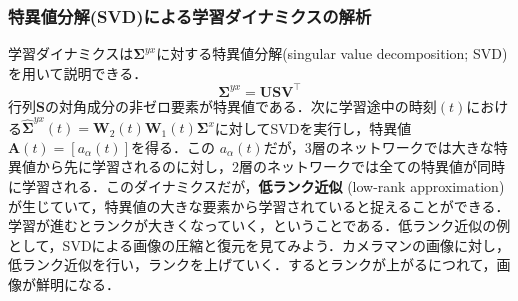\subsubsection{特異値分解(SVD)による学習ダイナミクスの解析}学習ダイナミクスは$ \mathbf{\Sigma}^{yx}$に対する特異値分解(singular value decomposition; SVD)を用いて説明できる．
$$
\mathbf{\Sigma}^{yx}=\mathbf{USV}^\top
$$
行列$ \mathbf{ S}$の対角成分の非ゼロ要素が特異値である．次に学習途中の時刻$(t)$における$\hat{\mathbf{\Sigma}}^{yx}(t)=\mathbf{W}_2 (t) \mathbf{W}_1(t) \mathbf{\Sigma}^{x}$に対してSVDを実行し，特異値$\mathbf{A}(t)=[a_{\alpha}(t)]$を得る．この $a _ {\alpha}(t)$だが，3層のネットワークでは大きな特異値から先に学習されるのに対し，2層のネットワークでは全ての特異値が同時に学習される．このダイナミクスだが，\textbf{低ランク近似} (low-rank approximation)が生じていて，特異値の大きな要素から学習されていると捉えることができる．学習が進むとランクが大きくなっていく，ということである．低ランク近似の例として，SVDによる画像の圧縮と復元を見てみよう．カメラマンの画像に対し，低ランク近似を行い，ランクを上げていく．するとランクが上がるにつれて，画像が鮮明になる．